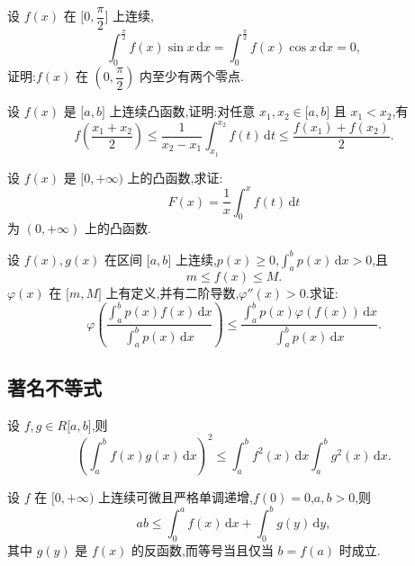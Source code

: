 \documentclass[../数学分析培优讲义.tex]{subfiles}
\begin{document}
\begin{example}
设 $f(x)$ 在 $\lbrack 0,\dfrac{\pi}{2}\rbrack$ 上连续,
\[
    \int_0^{\frac{\pi}{2}}f(x)\sin x\,\mathrm{d}x
    =\int_0^{\frac{\pi}{2}}f(x)\cos x\,\mathrm{d}x=0,
\]
证明:$f(x)$ 在 $\left(0,\dfrac{\pi}{2}\right)$ 内至少有两个零点.
\end{example}
\exampleblank

\begin{example}[Hadamard 定理]
设 $f(x)$ 是 $\lbrack a,b\rbrack$ 上连续凸函数,证明:对任意 $x_1,x_2\in\lbrack a,b\rbrack$ 且 $x_1<x_2$,有
\[
    f\left(\dfrac{x_1+x_2}{2}\right)
    \leq\dfrac{1}{x_2-x_1}\int_{x_1}^{x_2}f(t)\,\mathrm{d}t
    \leq\dfrac{f(x_1)+f(x_2)}{2}.
\]
\end{example}
\exampleblank

\begin{example}
设 $f(x)$ 是 $\lbrack 0,+\infty)$ 上的凸函数,求证:
\[
    F(x)=\dfrac{1}{x}\int_0^xf(t)\,\mathrm{d}t
\]
为 $(0,+\infty)$ 上的凸函数.
\end{example}
\exampleblank

\begin{example}[\markstar]
设 $f(x),g(x)$ 在区间 $\lbrack a,b\rbrack$ 上连续,$p(x)\geq0$,$\displaystyle\int_a^bp(x)\,\mathrm{d}x>0$,且
\[
    m\leq f(x)\leq M.
\]
$\varphi(x)$ 在 $\lbrack m,M\rbrack$ 上有定义,并有二阶导数,$\varphi''(x)>0$.求证:
\[
    \varphi\left(
    \dfrac{\displaystyle\int_a^bp(x)f(x)\,\mathrm{d}x}
    {\displaystyle\int_a^bp(x)\,\mathrm{d}x}
    \right)
    \leq
    \dfrac{\displaystyle\int_a^bp(x)\varphi(f(x))\,\mathrm{d}x}
    {\displaystyle\int_a^bp(x)\,\mathrm{d}x}.
\]
\end{example}
\exampleblank


\newpage

\subsection{著名不等式}

\begin{theorem}
设 $f,g\in R\lbrack a,b\rbrack$,则
\[
    \left(\int_a^bf(x)g(x)\,\mathrm{d}x\right)^2
    \leq\int_a^bf^2(x)\,\mathrm{d}x\int_a^bg^2(x)\,\mathrm{d}x.
\]
\end{theorem}

\begin{theorem}
设 $f$ 在 $\lbrack 0,+\infty)$ 上连续可微且严格单调递增,$f(0)=0$,$a,b>0$,则
\[
    ab\leq\int_0^af(x)\,\mathrm{d}x+\int_0^bg(y)\,\mathrm{d}y,
\]
其中 $g(y)$ 是 $f(x)$ 的反函数,而等号当且仅当 $b=f(a)$ 时成立.
\end{theorem}
\end{document}
